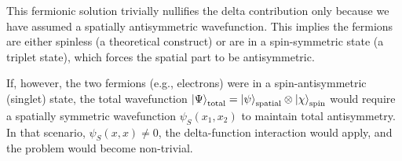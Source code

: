 This fermionic solution trivially nullifies the delta contribution
only because we have assumed a spatially antisymmetric wavefunction.
This implies the fermions are either spinless (a theoretical construct)
or are in a spin-symmetric state (a triplet state),
which forces the spatial part to be antisymmetric.

If, however, the two fermions (e.g., electrons) were in a
spin-antisymmetric (singlet) state, the total wavefunction
$\ket{\Psi}_{\text{total}} = \ket{\psi}_{\text{spatial}}
\otimes \ket{\chi}_{\text{spin}}$
would require a spatially symmetric wavefunction $\psi_S(x_1, x_2)$
to maintain total antisymmetry. In that scenario,
$\psi_S(x, x) \neq 0$, the delta-function interaction would apply,
and the problem would become non-trivial.
